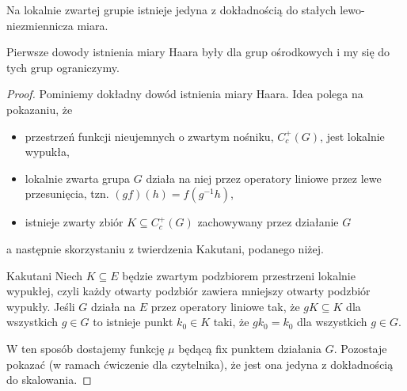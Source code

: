 
\begin{theorem}{}{}
  Na lokalnie zwartej grupie istnieje jedyna z dokładnością do stałych lewo-niezmiennicza miara.
\end{theorem}

Pierwsze dowody istnienia miary Haara były dla grup ośrodkowych i my się do tych grup ograniczymy.

\begin{proof}
  Pominiemy dokładny dowód istnienia miary Haara. Idea polega na pokazaniu, że 
  \begin{itemize}
    \item przestrzeń funkcji nieujemnych o zwartym nośniku, $C_c^+(G)$, jest lokalnie wypukła,
    \item lokalnie zwarta grupa $G$ działa na niej przez operatory liniowe przez lewe przesunięcia, tzn. $(gf)(h)=f(g^{-1}h)$,
    \item istnieje zwarty zbiór $K\subseteq C_c^+(G)$ zachowywany przez działanie $G$
  \end{itemize}
  
  a następnie skorzystaniu z twierdzenia Kakutani, podanego niżej.

  \begin{theorem}{Kakutani}{}
    Niech $K\subseteq E$ będzie zwartym podzbiorem przestrzeni lokalnie wypukłej, czyli każdy otwarty podzbiór zawiera mniejszy otwarty podzbiór wypukły. Jeśli $G$ działa na $E$ przez operatory liniowe tak, że $gK\subseteq K$ dla wszystkich $g\in G$ to istnieje punkt $k_0\in K$ taki, że $gk_0=k_0$ dla wszystkich $g\in G$.
  \end{theorem}

  W ten sposób dostajemy funkcję $\mu$ będącą fix punktem działania $G$. Pozostaje pokazać (w ramach ćwiczenie dla czytelnika), że jest ona jedyna z dokładnością do skalowania.
\end{proof}


%
%








